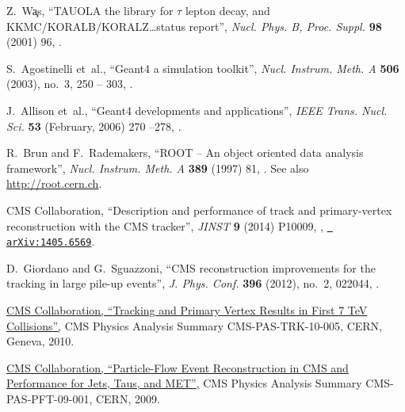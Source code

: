 \documentclass[12pt]{thesis}  %
\begin{document}
\begin{thebibliography}{100}
\hrefCMSnoop {} {Z.~W\c{a}s, ``{TAUOLA} the library for $\tau$ lepton decay,
  and {KKMC/KORALB/KORALZ}\ldots status report'',} \textit{ Nucl. Phys. B,
  Proc. Suppl.} \textbf{ 98} (2001) 96,
  \href{http://dx.doi.org/10.1016/S0920-5632(01)01200-2}{}.

S.~Agostinelli\hrefCMSnoop {} { {et~al.}, ``Geant4 a simulation toolkit'',}
  \textit{ Nucl. Instrum. Meth. A} \textbf{ 506} (2003), no.~3, 250 -- 303,
  \href{http://dx.doi.org/10.1016/S0168-9002(03)01368-8}{}.

J.~Allison\hrefCMSnoop {} { {et~al.}, ``Geant4 developments and
  applications'',} \textit{ {IEEE} Trans. Nucl. Sci.} \textbf{ 53} (February,
  2006) 270 --278,
  \href{http://dx.doi.org/10.1109/TNS.2006.869826}{}.

\hrefCMSnoop {} {R.~Brun and F.~Rademakers, ``{ROOT} -- An object oriented data
  analysis framework'',} \textit{ Nucl. Instrum. Meth. A} \textbf{ 389} (1997)
  81,
  \href{http://dx.doi.org/10.1016/S0168-9002(97)00048-X}{}.
  See also \url{http://root.cern.ch}.

\hrefCMSnoop {} {{ CMS} Collaboration, ``Description and performance of track
  and primary-vertex reconstruction with the CMS tracker'',} \textit{ JINST}
  \textbf{ 9} (2014) P10009,
  \href{http://dx.doi.org/10.1088/1748-0221/9/10/P10009}{},
  \href{http://www.arXiv.org/abs/1405.6569}{\texttt{ arXiv:1405.6569}}.

\hrefCMSnoop {} {D.~Giordano and G.~Sguazzoni, ``CMS reconstruction
  improvements for the tracking in large pile-up events'',} \textit{ J. Phys.
  Conf.} \textbf{ 396} (2012), no.~2, 022044,
  \href{http://dx.doi.org/10.1088/1742-6596/396/2/022044}{}.

\href {http://cds.cern.ch/record/1279383/} {{ CMS} Collaboration, ``{Tracking
  and Primary Vertex Results in First 7 TeV Collisions}'',} CMS Physics
  Analysis Summary CMS-PAS-TRK-10-005, CERN, Geneva, 2010.

\href {http://cds.cern.ch/record/1194487} {{ CMS} Collaboration,
  ``Particle-Flow Event Reconstruction in CMS and Performance for Jets, Taus,
  and MET'',} CMS Physics Analysis Summary CMS-PAS-PFT-09-001, CERN, 2009.


\end{thebibliography}
\end{document}
